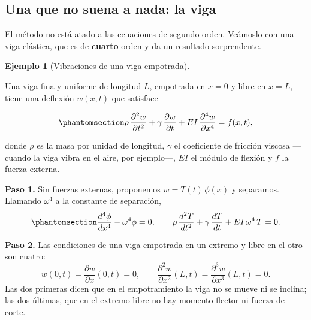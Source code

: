 \documentclass[
  spanish,
  a4paper,
]{scrbook}
\theoremstyle{definition}
\theoremstyle{plain}
\theoremstyle{definition}
\newtheorem{example}{Ejemplo}[chapter]
\theoremstyle{plain}
\theoremstyle{definition}
\theoremstyle{remark}
\begin{document}
\subsection{Una que no suena a nada: la viga}\label{sec-viga}

El método no está atado a las ecuaciones de segundo orden. Veámoslo con
una viga elástica, que es de \textbf{cuarto} orden y da un resultado
sorprendente.

\begin{example}[Vibraciones de una viga
empotrada]\protect\hypertarget{exm-viga}{}\label{exm-viga}

Una viga fina y uniforme de longitud \(L\), empotrada en \(x=0\) y libre
en \(x=L\), tiene una deflexión \(w(x,t)\) que satisface

\begin{equation}\protect\phantomsection\label{eq-viga}{
\rho\,\frac{\partial^2 w}{\partial t^2} + \gamma\,\frac{\partial w}{\partial t}
+ EI\,\frac{\partial^4 w}{\partial x^4} = f(x,t) ,
}\end{equation}

donde \(\rho\) es la masa por unidad de longitud, \(\gamma\) el
coeficiente de fricción viscosa ---cuando la viga vibra en el aire, por
ejemplo---, \(EI\) el módulo de flexión y \(f\) la fuerza externa.

\textbf{Paso 1.} Sin fuerzas externas, proponemos \(w = T(t)\,\phi(x)\)
y separamos. Llamando \(\omega^4\) a la constante de separación,
\begin{equation}\protect\phantomsection\label{eq-viga-separada}{
\frac{d^4\phi}{dx^4} - \omega^4\phi = 0, \qquad
\rho\,\frac{d^2T}{dt^2} + \gamma\,\frac{dT}{dt} + EI\,\omega^4\,T = 0 .
}\end{equation}

\textbf{Paso 2.} Las condiciones de una viga empotrada en un extremo y
libre en el otro son cuatro: \[
w(0,t) = \frac{\partial w}{\partial x}(0,t) = 0, \qquad
\frac{\partial^2 w}{\partial x^2}(L,t) = \frac{\partial^3 w}{\partial x^3}(L,t) = 0 .
\] Las dos primeras dicen que en el empotramiento la viga no se mueve ni
se inclina; las dos últimas, que en el extremo libre no hay momento
flector ni fuerza de corte.


\end{example}
\end{document}
